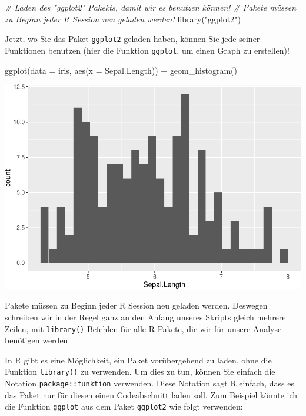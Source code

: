 \documentclass[
]{book}
\newenvironment{Shaded}{\begin{snugshade}}{\end{snugshade}}
\newcommand{\AttributeTok}[1]{\textcolor[rgb]{0.77,0.63,0.00}{#1}}
\newcommand{\CommentTok}[1]{\textcolor[rgb]{0.56,0.35,0.01}{\textit{#1}}}
\newcommand{\FunctionTok}[1]{\textcolor[rgb]{0.00,0.00,0.00}{#1}}
\newcommand{\NormalTok}[1]{#1}
\newcommand{\SpecialCharTok}[1]{\textcolor[rgb]{0.00,0.00,0.00}{#1}}
\newcommand{\StringTok}[1]{\textcolor[rgb]{0.31,0.60,0.02}{#1}}
\begin{document}
\begin{Shaded}
\begin{Highlighting}[]
\CommentTok{\#   Laden des "ggplot2" Pakekts, damit wir es benutzen können!}
\CommentTok{\#   Pakete müssen zu Beginn jeder R Session neu geladen werden!}
\FunctionTok{library}\NormalTok{(}\StringTok{"ggplot2"}\NormalTok{)}
\end{Highlighting}
\end{Shaded}

Jetzt, wo Sie das Paket \texttt{ggplot2} geladen haben, können Sie jede seiner Funktionen benutzen (hier die Funktion \texttt{ggplot}, um einen Graph zu erstellen)!

\begin{Shaded}
\begin{Highlighting}[]
\FunctionTok{ggplot}\NormalTok{(}\AttributeTok{data =}\NormalTok{ iris, }\FunctionTok{aes}\NormalTok{(}\AttributeTok{x =}\NormalTok{ Sepal.Length)) }\SpecialCharTok{+} 
  \FunctionTok{geom\_histogram}\NormalTok{()}
\end{Highlighting}
\end{Shaded}

\includegraphics{CFH_R_bookdown_files/figure-latex/unnamed-chunk-10-1.pdf}

Pakete müssen zu Beginn jeder R Session neu geladen werden. Deswegen schreiben wir in der Regel ganz an den Anfang unseres Skripts gleich mehrere Zeilen, mit \texttt{library()} Befehlen für alle R Pakete, die wir für unsere Analyse benötigen werden.

In R gibt es eine Möglichkeit, ein Paket vorübergehend zu laden, ohne die Funktion \texttt{library()} zu verwenden. Um dies zu tun, können Sie einfach die Notation \texttt{package::funktion} verwenden. Diese Notation sagt R einfach, dass es das Paket nur für diesen einen Codeabschnitt laden soll. Zum Beispiel könnte ich die Funktion \texttt{ggplot} aus dem Paket \texttt{ggplot2} wie folgt verwenden:
\end{document}
